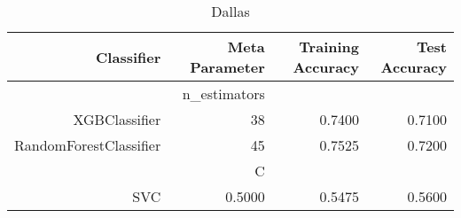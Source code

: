 
\begin{table}[H]
    \caption{Dallas}
    \centering
    \begin{tabular}{|r|r|r|r|}
        \hline
        Classifier &Meta Parameter &Training Accuracy
        &Test Accuracy\\
        \hline
        &n\_estimators &\multicolumn{2}{|r|}{}\\
        \hline
        XGBClassifier &38 &0.7400 &0.7100\\
        \hline
        RandomForestClassifier &45 &0.7525 &0.7200\\
        \hline
        &C &\multicolumn{2}{|r|}{}\\
        \hline
        SVC &0.5000 &0.5475 &0.5600\\
        \hline
    \end{tabular}
\end{table}
